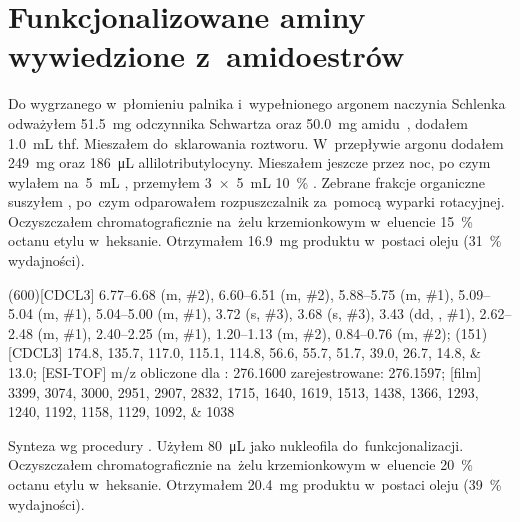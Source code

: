 \section{Funkcjonalizowane aminy wywiedzione z~amidoestrów}\label{experimental:amidoester-products}
Do wygrzanego w~płomieniu palnika i~wypełnionego argonem naczynia Schlenka odważyłem
  \SI{51.5}{\mg} odczynnika Schwartza oraz \SI{50.0}{\mg} amidu~,
  dodałem \SI{1.0}{\mL} \gls{thf}.
Mieszałem do~sklarowania roztworu.
W~przepływie argonu dodałem \SI{249}{\mg}  oraz \SI{186}{\uL} allilotributylocyny.
Mieszałem jeszcze przez noc, po czym wylałem na~\SI{5}{\mL} ,
  przemyłem \SI[product-units = single]{3 x 5}{\mL} \SI{10}{\percent} .
Zebrane frakcje organiczne suszyłem , po~czym odparowałem rozpuszczalnik za~pomocą
  wyparki rotacyjnej.
Oczyszczałem chromatograficznie na~żelu krzemionkowym w~eluencie \SI{15}{\percent} octanu
  etylu w~heksanie.
Otrzymałem \SI{16.9}{\mg} produktu w~postaci oleju (\SI{31}{\percent} wydajności).

\begin{fullexp}
  \NMR(600)[CDCL3] \numrange{6.77}{6.68} (m, \#{2}), \numrange{6.60}{6.51} (m, \#{2}), \numrange{5.88}{5.75} (m, \#{1}), \numrange{5.09}{5.04} (m, \#{1}), \numrange{5.04}{5.00} (m, \#{1}), \num{3.72} (s, \#{3}), \num{3.68} (s, \#{3}), \num{3.43} (dd, , \#{1}), \numrange{2.62}{2.48} (m, \#{1}), \numrange{2.40}{2.25} (m, \#{1}), \numrange{1.20}{1.13} (m, \#{2}), \numrange{0.84}{0.76} (m, \#{2});
  (151)[CDCL3] \numlist{174.8; 135.7; 117.0; 115.1; 114.8; 56.6; 55.7; 51.7; 39.0; 26.7; 14.8; 13.0};
  [ESI-TOF] m/z obliczone dla : \num{276.1600} zarejestrowane: \num{276.1597};
  [film] \numlist{3399; 3074; 3000; 2951; 2907; 2832; 1715; 1640; 1619; 1513; 1438; 1366; 1293; 1240; 1192; 1158; 1129; 1092; 1038}
\end{fullexp}

Synteza wg procedury .
Użyłem \SI{80}{\uL}  jako nukleofila do~funkcjonalizacji.
Oczyszczałem chromatograficznie na~żelu krzemionkowym w~eluencie \SI{20}{\percent} octanu
  etylu w~heksanie.
Otrzymałem \SI{20.4}{\mg} produktu w~postaci oleju (\SI{39}{\percent} wydajności).

